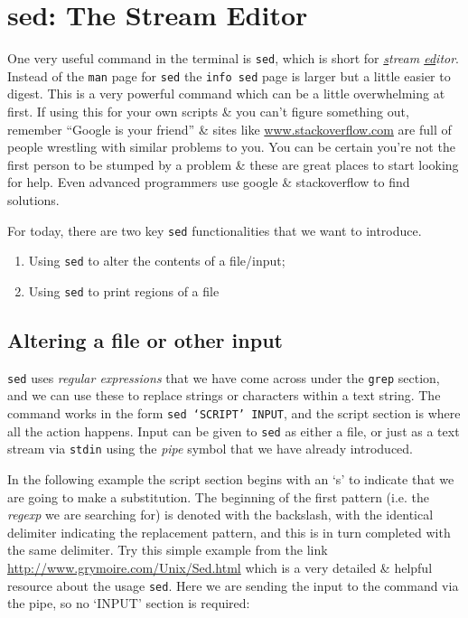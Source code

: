 \documentclass[a4paper,12pt,twoside]{memoir}
\begin{document}
\section{sed: The Stream Editor}
\begin{information}
One very useful command in the terminal is \texttt{sed}, which is short for \textit{\underline{s}tream \underline{ed}itor}.
Instead of the \texttt{man} page for \texttt{sed} the \texttt{info sed} page is larger but a little easier to digest.
This is a very powerful command which can be a little overwhelming at first.
If using this for your own scripts \& you can't figure something out, remember ``Google is your friend'' \& sites like \url{www.stackoverflow.com} are full of people wrestling with similar problems to you.
You can be certain you're not the first person to be stumped by a problem \& these are great places to start looking for help. 
Even advanced programmers use google \& stackoverflow to find solutions.\\
\end{information}

For today, there are two key \texttt{sed} functionalities that we want to introduce.\\
\begin{enumerate}
\item Using \texttt{sed} to alter the contents of a file/input;
\item Using \texttt{sed} to print regions of a file
\end{enumerate}

\subsection*{Altering a file or other input}
\texttt{sed} uses \textit{regular expressions} that we have come across under the \texttt{grep} section, and we can use these to replace strings or characters within a text string.
The command works in the form \texttt{sed `SCRIPT' INPUT}, and the script section is where all the action happens.
Input can be given to \texttt{sed} as either a file, or just as a text stream via \texttt{stdin} using the \textit{pipe} symbol that we have already introduced.

\begin{steps}
In the following example the script section begins with an `s' to indicate that we are going to make a substitution.
The beginning of the first pattern (i.e. the \textit{regexp} we are searching for) is denoted with the backslash, with the identical delimiter indicating the replacement pattern, and this is in turn completed with the same delimiter.
Try this simple example from the link \url{http://www.grymoire.com/Unix/Sed.html} which is a very detailed \& helpful resource about the usage \texttt{sed}.
Here we are sending the input to the command via the pipe, so no `INPUT' section is required: \\
\end{steps}
\end{document}
